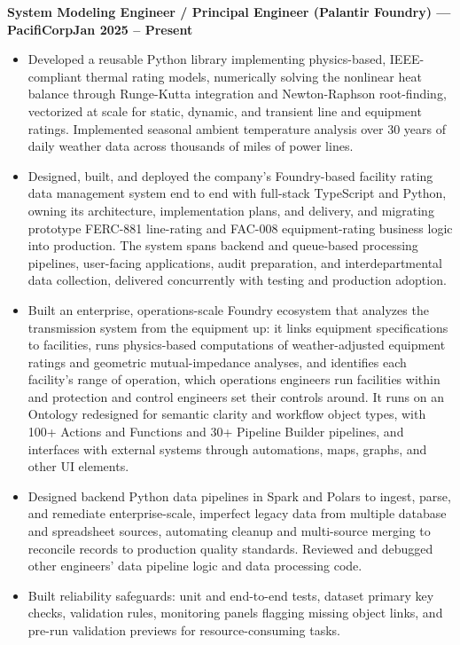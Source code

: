 \documentclass[10pt, letterpaper]{article}
\newcommand{\jobline}[2]{%
  \vspace{5pt}%
  \noindent\textbf{#1}\hfill\textbf{#2}\par%
  \vspace{1pt}%
}
\newenvironment{rlist}{%
  \begin{itemize}[leftmargin=1.4em, itemsep=1pt, topsep=2pt, parsep=0pt]%
}{%
  \end{itemize}%
}
\begin{document}
\jobline{System Modeling Engineer / Principal Engineer (Palantir Foundry) --- PacifiCorp}{Jan 2025 -- Present}
\begin{rlist}
  \item Developed a reusable Python library implementing physics-based, IEEE-compliant thermal rating models, numerically solving the nonlinear heat balance through Runge-Kutta integration and Newton-Raphson root-finding, vectorized at scale for static, dynamic, and transient line and equipment ratings. Implemented seasonal ambient temperature analysis over 30 years of daily weather data across thousands of miles of power lines.
  \item Designed, built, and deployed the company's Foundry-based facility rating data management system end to end with full-stack TypeScript and Python, owning its architecture, implementation plans, and delivery, and migrating prototype FERC-881 line-rating and FAC-008 equipment-rating business logic into production. The system spans backend and queue-based processing pipelines, user-facing applications, audit preparation, and interdepartmental data collection, delivered concurrently with testing and production adoption.
  \item Built an enterprise, operations-scale Foundry ecosystem that analyzes the transmission system from the equipment up: it links equipment specifications to facilities, runs physics-based computations of weather-adjusted equipment ratings and geometric mutual-impedance analyses, and identifies each facility's range of operation, which operations engineers run facilities within and protection and control engineers set their controls around. It runs on an Ontology redesigned for semantic clarity and workflow object types, with 100+ Actions and Functions and 30+ Pipeline Builder pipelines, and interfaces with external systems through automations, maps, graphs, and other UI elements.
  \item Designed backend Python data pipelines in Spark and Polars to ingest, parse, and remediate enterprise-scale, imperfect legacy data from multiple database and spreadsheet sources, automating cleanup and multi-source merging to reconcile records to production quality standards. Reviewed and debugged other engineers' data pipeline logic and data processing code.
  \item Built reliability safeguards: unit and end-to-end tests, dataset primary key checks, validation rules, monitoring panels flagging missing object links, and pre-run validation previews for resource-consuming tasks.

\end{rlist}
\end{document}
